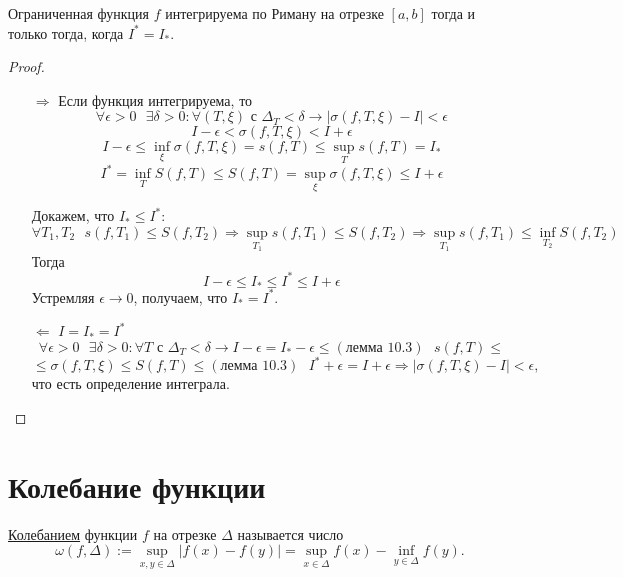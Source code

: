     \begin{theorem}
    	Ограниченная функция $f$ интегрируема по Риману на отрезке $[a, b]$ тогда и только тогда, когда $I^{*} = I_{*}$.
    \end{theorem}
    
    \begin{proof}
    	\begin{enumerate}
    		\item[$\Rightarrow$] Если функция интегрируема, то 
    		\[ \forall \epsilon > 0 \text{ } \exists \delta > 0: \forall (T, \xi) \text{ с } \Delta_T < \delta \rightarrow |\sigma(f, T, \xi) - I| < \epsilon \]
    		\[ I - \epsilon < \sigma(f, T, \xi) < I + \epsilon \]
    		\[ I - \epsilon \leqslant \inf_{\xi} {\sigma(f, T, \xi)} = s(f, T) \leqslant \sup_{T} {s(f, T)} = I_{*} \]
    		\[ I^{*} = \inf_{T} {S(f, T)} \leqslant S(f, T) = \sup_{\xi} {\sigma(f, T, \xi)} \leqslant I + \epsilon \]
    		
    		Докажем, что $I_{*} \leqslant I^{*}$:
    		\[ \forall T_1, T_2 \text{ } s(f, T_1) \leqslant S(f, T_2) \Rightarrow \sup_{T_1} {s(f, T_1)} \leqslant S(f, T_2) \Rightarrow \sup_{T_1} {s(f, T_1)} \leqslant \inf_{T_2} {S(f, T_2)} \]
    		Тогда
    		\[ I - \epsilon \leqslant I_{*} \leqslant I^{*} \leqslant I + \epsilon \]
    		Устремляя $\epsilon \to 0$, получаем, что $I_{*} = I^{*}$.
    		\item[$\Leftarrow$] $I = I_{*} = I^{*}$
    		\[ \forall \epsilon > 0 \text{ } \exists \delta > 0 : \forall T \text{ с } \Delta_T < \delta \rightarrow I - \epsilon = I_{*} - \epsilon \leqslant (\text{лемма 10.3}) \text{ } s(f, T) \leqslant \]
    		\[ \leqslant \sigma(f, T, \xi) \leqslant S(f, T) \leqslant (\text{лемма 10.3}) \text{ } I^{*} + \epsilon = I + \epsilon \Rightarrow |\sigma(f, T, \xi) - I| < \epsilon, \]
    		что есть определение интеграла.
    	\end{enumerate}
    \end{proof}
    
    \section{Колебание функции}
    
    \begin{definition}
    	\underline{Колебанием} функции $f$ на отрезке $\Delta$ называется число
    	\[ \omega(f, \Delta) := \sup_{x, y \in \Delta}{|f(x) - f(y)|} = \sup_{x \in \Delta}{f(x)} - \inf_{y \in \Delta}{f(y)}. \]
    \end{definition}
    
